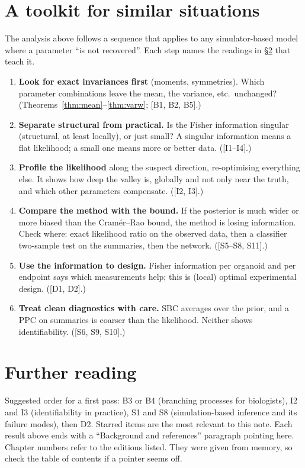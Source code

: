 \documentclass[11pt]{article}
\theoremstyle{definition}
\theoremstyle{remark}
\begin{document}
\section{A toolkit for similar situations}\label{sec:toolkit}
The analysis above follows a sequence that applies to any simulator-based model where a parameter ``is not recovered''. Each step names the readings in \S\ref{sec:reading} that teach it.
\begin{enumerate}
\item \textbf{Look for exact invariances first} (moments, symmetries). Which parameter combinations leave the mean, the variance, etc.\ unchanged? (Theorems~\ref{thm:mean}--\ref{thm:varw}; [B1, B2, B5].)
\item \textbf{Separate structural from practical.} Is the Fisher information singular (structural, at least locally), or just small? A singular information means a flat likelihood; a small one means more or better data. ([I1--I4].)
\item \textbf{Profile the likelihood} along the suspect direction, re-optimising everything else. It shows how deep the valley is, globally and not only near the truth, and which other parameters compensate. ([I2, I3].)
\item \textbf{Compare the method with the bound.} If the posterior is much wider or more biased than the Cram\'er--Rao bound, the method is losing information. Check where: exact likelihood ratio on the observed data, then a classifier two-sample test on the summaries, then the network. ([S5--S8, S11].)
\item \textbf{Use the information to design.} Fisher information per organoid and per endpoint says which measurements help; this is (local) optimal experimental design. ([D1, D2].)
\item \textbf{Treat clean diagnostics with care.} SBC averages over the prior, and a PPC on summaries is coarser than the likelihood. Neither shows identifiability. ([S6, S9, S10].)
\end{enumerate}

\section{Further reading}\label{sec:reading}
Suggested order for a first pass: B3 or B4 (branching processes for biologists), I2 and I3 (identifiability in practice), S1 and S8 (simulation-based inference and its failure modes), then D2. Starred items are the most relevant to this note. Each result above ends with a ``Background and references'' paragraph pointing here. Chapter numbers refer to the editions listed. They were given from memory, so check the table of contents if a pointer seems off.
\end{document}
